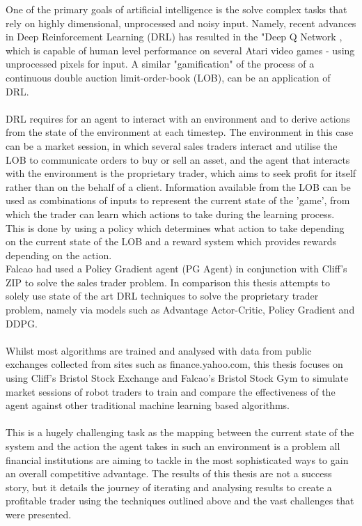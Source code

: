 \documentclass[ %
                    author={Ashwinder Khurana},
                supervisor={Prof Dave Cliff},
                    degree={MEng},
                     title={The Deeply Reinforced Trader},
                  subtitle={},
                      type={enterprise},
                      year={2020} ]{dissertation}
\begin{document}
\noindent
One of the primary goals of artificial intelligence is the solve complex tasks that rely on highly dimensional, unprocessed and noisy input. Namely, recent advances in Deep Reinforcement Learning (DRL) has resulted in the "Deep Q Network \cite{DQN}, which is capable of human level performance on several Atari video games - using unprocessed pixels for input. A similar "gamification" of the process of a continuous double auction limit-order-book (LOB), can be an application of DRL.
\\
\\
DRL requires for an agent to interact with an environment and to derive actions from the state of the environment at each timestep. The environment in this case can be a market session, in which several sales traders interact and utilise the LOB to communicate orders to buy or sell an asset, and the agent that interacts with the environment is the proprietary trader, which aims to seek profit for itself rather than on the behalf of a client. Information available from the LOB can be used as combinations of inputs to represent the current state of the 'game', from which the trader can learn which actions to take during the learning process. This is done by using a policy which determines what action to take depending on the current state of the LOB and a reward system which provides rewards depending on the action.
\\
Falcao had used a Policy Gradient agent (PG Agent) in conjunction with Cliff's ZIP to solve the sales trader problem. In comparison this thesis attempts to solely use state of the art DRL techniques to solve the proprietary trader problem, namely via models such as Advantage Actor-Critic, Policy Gradient and DDPG. 
\\
\\
Whilst most algorithms are trained and analysed with data from public exchanges collected from sites such as finance.yahoo.com, this thesis focuses on using Cliff's Bristol Stock Exchange \cite{BSE} and Falcao's Bristol Stock Gym \cite{BSG} to simulate market sessions of robot traders to train and compare the effectiveness of the agent against other traditional machine learning based algorithms.
\\
\\
This is a hugely challenging task as the mapping between the current state of the system and the action the agent takes in such an environment is a problem all financial institutions are aiming to tackle in the most sophisticated ways to gain an overall competitive advantage. The results of this thesis are not a success story, but it details the journey of iterating and analysing results to create a profitable trader using the techniques outlined above and the vast challenges that were presented.   
\end{document}
